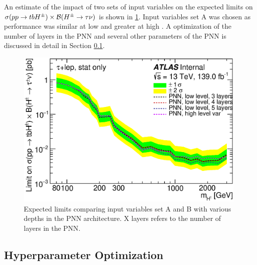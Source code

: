       An estimate of the impact of two sets of input variables on the expected limits on $\sigma(pp\to tbH^{\pm})\times \mathrm{\cal{B}}(H^{\pm} \to \tau \nu)$ is shown in \ref{fig:variable-comparison-limits}. Input variables set A was chosen as performance was similar at low \mHpm and greater at high \mHpm. A optimization of the number of layers in the \gls{PNN} and several other parameters of the \gls{PNN} is discussed in detail in Section \ref{ssec:hpo}.
			\begin{figure}	
				\begin{center}
					\includegraphics[width=.75\textwidth,keepaspectratio=true]{chapters/chapter6_HPlus/images/taulep_limits_PNN_low_lv_vs_high_lv.eps}
				\end{center}
				\caption{Expected limits comparing input variables set A and B with various depths in the \gls{PNN} architecture. X layers refers to the number of layers in the \gls{PNN}. }
				\label{fig:variable-comparison-limits}
			\end{figure}	

		\subsection{Hyperparameter Optimization}\label{ssec:hpo}

